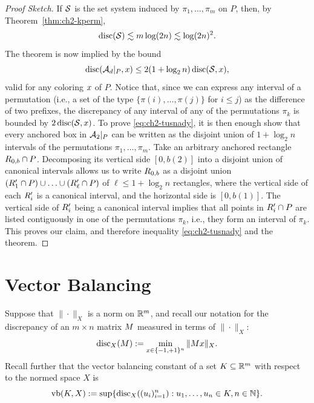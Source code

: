 \begin{proof}[Proof Sketch]
  If \(\SS\) is the set system induced by \(\pi_1, \ldots,
  \pi_m\) on \(P\), then, by Theorem~\ref{thm:ch2-kperm},
  \[
  \disc(\SS) \lesssim m \log(2n) \lesssim \log(2n)^2.
  \]
  The theorem is now implied by the bound
  \begin{equation}\label{eq:ch2-tusnady}
    \disc(\AA_d|_P, \col) \le 2(1 + \log_2 n) \disc(\SS, \col),
  \end{equation}
  valid for any coloring $\col$ of $P$.
  Notice that, since we can express any interval of a permutation (i.e., a set
  of the type \(\{\pi(i), \ldots, \pi(j)\}\) for \(i \le j\)) as the
  difference of two prefixes, the discrepancy of any interval of any
  of the permutations \(\pi_k\) is bounded by \(2\disc(\SS,
  \col)\).
  To prove \eqref{eq:ch2-tusnady}, it is then enough show that every anchored box in $\AA_2|_P$ can be written as the disjoint union of $1+\log_2 n$  intervals of the permutations $\pi_1, \ldots, \pi_m$. Take an arbitrary anchored rectangle $\rbox_{0,b} \cap P$. Decomposing its vertical side $[0, b(2)]$ into a disjoint union of canonical intervals allows us to write $\rbox_{0,b}$ as a disjoint union $(\rbox'_1 \cap P) \cup \ldots\cup (\rbox'_\ell\cap P)$ of  $\ell \le 1+\log_2 n$ rectangles, where the vertical side of each $\rbox'_i$ is a canonical interval, and the horizontal side is $[0,b(1)]$. The vertical side of $\rbox'_i$ being a canonical interval implies that all points in $\rbox'_i\cap P$ are listed contiguously in one of the permutations $\pi_k$, i.e., they form an interval of $\pi_k$. This proves our claim, and therefore inequality \eqref{eq:ch2-tusnady} and the theorem.
\end{proof}

\section{Vector Balancing}

Suppose that \(\|\cdot\|_X\) is a norm on \(\R^m\), and recall our
notation for the discrepancy of an \(m\times n\) matrix \(\mat\)
measured in terms of \(\|\cdot\|_X\):
\[
\disc_X(\mat) \eqdef \min_{\col \in \{-1,+1\}^n} \|\mat \col\|_X.
\]
Recall further that the vector balancing constant of a set \(K
\subseteq \R^m\) with respect to the normed space \(X\) is
\[
  \vb(K, X) \eqdef \sup\{\disc_X((u_i)_{i=1}^n): u_1, \ldots, u_n \in
  K, n \in \N\}.
\]

